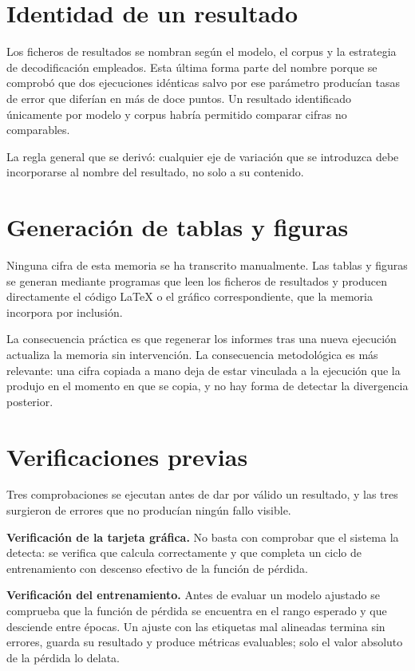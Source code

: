 \section{Identidad de un resultado}

Los ficheros de resultados se nombran según el modelo, el corpus y la estrategia de
decodificación empleados. Esta última forma parte del nombre porque se comprobó que dos
ejecuciones idénticas salvo por ese parámetro producían tasas de error que diferían en más
de doce puntos. Un resultado identificado únicamente por modelo y corpus habría permitido
comparar cifras no comparables.

La regla general que se derivó: cualquier eje de variación que se introduzca debe
incorporarse al nombre del resultado, no solo a su contenido.

\section{Generación de tablas y figuras}

Ninguna cifra de esta memoria se ha transcrito manualmente. Las tablas y figuras se generan
mediante programas que leen los ficheros de resultados y producen directamente el código
LaTeX o el gráfico correspondiente, que la memoria incorpora por inclusión.

La consecuencia práctica es que regenerar los informes tras una nueva ejecución actualiza
la memoria sin intervención. La consecuencia metodológica es más relevante: una cifra
copiada a mano deja de estar vinculada a la ejecución que la produjo en el momento en que
se copia, y no hay forma de detectar la divergencia posterior.

\section{Verificaciones previas}

Tres comprobaciones se ejecutan antes de dar por válido un resultado, y las tres surgieron
de errores que no producían ningún fallo visible.

\textbf{Verificación de la tarjeta gráfica.} No basta con comprobar que el sistema la
detecta: se verifica que calcula correctamente y que completa un ciclo de entrenamiento con
descenso efectivo de la función de pérdida.

\textbf{Verificación del entrenamiento.} Antes de evaluar un modelo ajustado se comprueba
que la función de pérdida se encuentra en el rango esperado y que desciende entre épocas.
Un ajuste con las etiquetas mal alineadas termina sin errores, guarda su resultado y
produce métricas evaluables; solo el valor absoluto de la pérdida lo delata.

